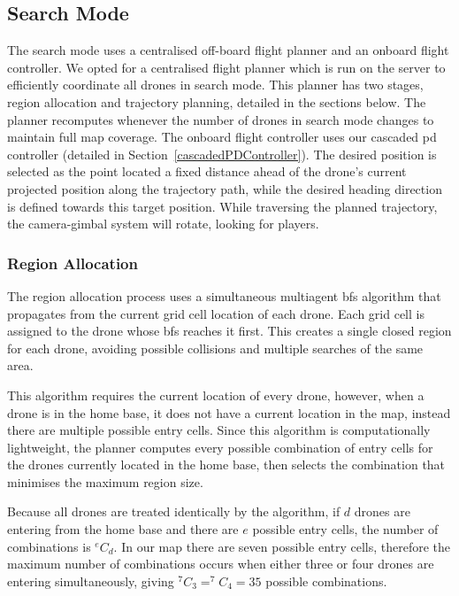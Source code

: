 \documentclass{report_template_oxford}
\begin{document}
\subsection{Search Mode} \label{search mode}%

The search mode uses a centralised off-board flight planner and an onboard flight controller. We opted for a centralised flight planner which is run on the server to efficiently coordinate all drones in search mode. This planner has two stages, region allocation and trajectory planning, detailed in the sections below. The planner recomputes whenever the number of drones in search mode changes to maintain full map coverage. The onboard flight controller uses our cascaded \gls{pd} controller (detailed in Section~\ref{cascadedPDController}). The desired position is selected as the point located a fixed distance ahead of the drone's current projected position along the trajectory path, while the desired heading direction is defined towards this target position. While traversing the planned trajectory, the camera-gimbal system will rotate, looking for players.

\subsubsection{Region Allocation}
The region allocation process uses a simultaneous multiagent \gls{bfs} algorithm that propagates from the current grid cell location of each drone. Each grid cell is assigned to the drone whose \gls{bfs} reaches it first. This creates a single closed region for each drone, avoiding possible collisions and multiple searches of the same area.

This algorithm requires the current location of every drone, however, when a drone is in the home base, it does not have a current location in the map, instead there are multiple possible entry cells. Since this algorithm is computationally lightweight, the planner computes every possible combination of entry cells for the drones currently located in the home base, then selects the combination that minimises the maximum region size.

Because all drones are treated identically by the algorithm, if $d$ drones are entering from the home base and there are $e$ possible entry cells, the number of combinations is $^eC_d$. In our map there are seven possible entry cells, therefore the maximum number of combinations occurs when either three or four drones are entering simultaneously, giving $^7C_3 = ^7C_4 = 35$ possible combinations.
\end{document}
